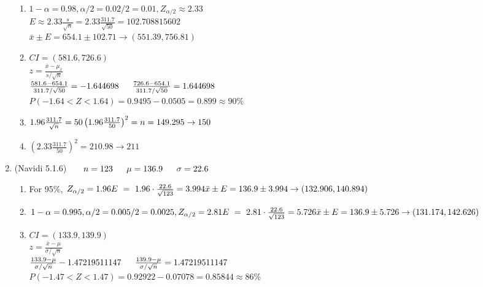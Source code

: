 \documentclass[11pt]{article}
\begin{document}
\begin{preview}
\begin{enumerate}
\begin{enumerate}
        \item$1-\alpha = 0.98, \alpha / 2 = 0.02/2=0.01, Z_{\alpha/2} \approx 2.33$ \\
        $E \approx 2.33\frac{s}{\sqrt{n}} = 2.33\frac{311.7}{\sqrt{50}}=102.708815602$ \\
        $\bar{x}\pm E = 654.1\pm102.71 \rightarrow (551.39,756.81)$
        
        \item $CI=(581.6,726.6)$ \\
        $z = \frac{\bar{x} - \mu_{\bar{x}}}{s/\sqrt{n}}$ \\
        $\frac{581.6-654.1}{311.7/ \sqrt{50}}=-1.644698  \hspace*{16pt}\frac{726.6-654.1}{311.7/ \sqrt{50}}=1.644698$ \\
        $P(-1.64 < Z < 1.64) = 0.9495-0.0505=0.899\approx 90\%$
        
        \item $1.96\frac{311.7}{\sqrt{n}}=50 \\
        \left(1.96\frac{311.7}{50}\right)^{2} = n = 149.295 \rightarrow 150$

        \item$ \left(2.33\frac{311.7}{50}\right)^{2} = 210.98 \rightarrow 211$
\end{enumerate}


\item (Navidi 5.1.6) $\hspace{16pt} n=123 \hspace*{16pt} \mu = 136.9 \hspace*{16pt} \sigma = 22.6$
\begin{enumerate}
        \item For 95\%, $Z_{\alpha/2} = 1.96 \\
        E\ =\ 1.96\cdot\frac{22.6}{\sqrt{123}} = 3.994\\
        \bar{x}\pm E = 136.9\pm3.994 \rightarrow (132.906,140.894)$

        \item $1-\alpha = 0.995, \alpha / 2 = 0.005/2=0.0025, Z_{\alpha/2} = 2.81\\ 
        E\ =\ 2.81\cdot\frac{22.6}{\sqrt{123}} = 5.726\\
        \bar{x}\pm E = 136.9\pm5.726 \rightarrow (131.174,142.626)$
        
        \item $CI=(133.9,139.9)$ \\
        $z = \frac{\bar{x} - \mu}{\sigma/\sqrt{n}}$ \\
        $\frac{133.9 - \mu}{\sigma/\sqrt{n}} - 1.47219511147\hspace*{16pt} \frac{139.9 - \mu}{\sigma/\sqrt{n}} = 1.47219511147$ \\
        $P(-1.47 < Z < 1.47) = 0.92922 -0.07078=0.85844\approx 86\%$
        

\end{enumerate}
\end{enumerate}
\end{preview}
\end{document}
